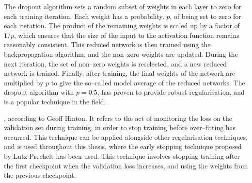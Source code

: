 The dropout algorithm sets a random subset of weights in each layer to zero for
each training iteration. Each weight has a probability, $p$, of being set to 
zero for each iteration. The product of the remaining weights is scaled up by 
a factor of $1/p$, which ensures that the size of the input to the activation 
function remains reasonably consistent.  This reduced network is then trained 
using the backpropagation algorithm, and the non--zero weights are updated. 
During the next iteration, the set of non--zero weights is reselected, and a 
new reduced network is trained.  Finally, after training, the final weights of 
the network are multiplied by $p$ to give the so--called model average of the 
reduced networks. The dropout algorithm with $p=0.5$, has proven to provide 
robust regularisation, and is a popular technique in the field\cite{Lecun2015}.

, according to Geoff
Hinton\cite{Hinton2015}. It refers to the act of monitoring the loss on the 
validation set during training, in order to stop training before over--fitting 
has occurred. This technique can be applied alongside other regularisation 
techniques, and is used throughout this thesis, where the early stopping 
technique proposed by Lutz Prechelt\cite{OrrGenevieveB.1998NNTo} has been used.
This technique involves stopping training after the first checkpoint when the 
validation loss increases, and using the weights from the previous checkpoint. 
